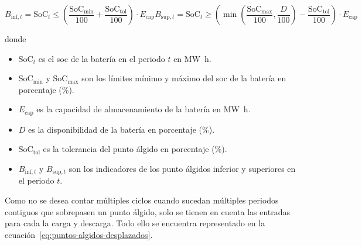 \begin{samepage}

  \begin{subequations}
    \label{eq:puntos-algidos-inf-sup}

    \begin{equation}
      B_{\text{inf}, t} = \mathrm{SoC}_{t} \le \left( \frac{\mathrm{SoC}_{\text{min}}}{100} + \frac{\mathrm{SoC}_{\text{tol}}}{100} \right) \cdot E_{\text{cap}}
    \end{equation}

    \begin{equation}
      B_{\text{sup}, t} = \mathrm{SoC}_{t} \ge \left( \min\left(\frac{\mathrm{SoC}_{\text{max}}}{100}, \frac{D}{100}\right) - \frac{\mathrm{SoC}_{\text{tol}}}{100} \right) \cdot E_{\text{cap}}
    \end{equation}

  \end{subequations}

  donde

  \begin{itemize}

    \item \( \mathrm{SoC}_{t} \) es el \gls{soc} de la batería en el periodo \( t \) en \si{{\mega\watt\hour}}.

    \item \( \mathrm{SoC}_{\text{min}} \) y \( \mathrm{SoC}_{\text{max}} \) son los límites mínimo y máximo del \gls{soc} de la batería en porcentaje (\%).

    \item \( E_{\text{cap}} \) es la capacidad de almacenamiento de la batería en \si{{\mega\watt\hour}}.

    \item \( D \) es la disponibilidad de la batería en porcentaje (\%).

    \item \( \mathrm{SoC}_{\text{tol}} \) es la tolerancia del punto álgido en porcentaje (\%).

    \item \( B_{\text{inf}, t} \) y \( B_{\text{sup}, t} \) son los indicadores de los punto álgidos inferior y superiores en el periodo \( t \).

  \end{itemize}

\end{samepage}

Como no se desea contar múltiples ciclos cuando sucedan múltiples periodos contiguos que sobrepasen un punto álgido, solo se tienen en cuenta las entradas para cada la carga y descarga. Todo ello se encuentra representado en la ecuación~\ref{eq:puntos-algidos-desplazados}.

